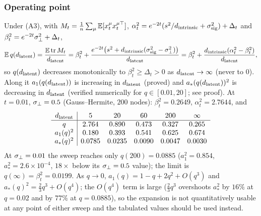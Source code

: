 \subsubsection{Operating point}

\begin{lemma}\label{lem:q-p1}
Under (A3), with $M_t=\tfrac1{n}\sum_\mu\mathbb{E}[x_t^\mu x_t^{\mu\top}]$, $\alpha_t^2=e^{-2t}(s^2/d_{\mathrm{intrinsic}}+\sigma_{\mathrm{sig}}^2)+\Delta_t$ and $\beta_t^2=e^{-2t}\sigma_{\perp}^2+\Delta_t$,
\begin{equation}\label{eq:q-p1}
\mathbb{E}\,q(d_{\mathrm{latent}})=\frac{\mathbb{E}\operatorname{tr}M_t}{d_{\mathrm{latent}}}=\beta_t^2+\frac{e^{-2t}\big(s^2+d_{\mathrm{intrinsic}}(\sigma_{\mathrm{sig}}^2-\sigma_{\perp}^2)\big)}{d_{\mathrm{latent}}}=\beta_t^2+\frac{d_{\mathrm{intrinsic}}(\alpha_t^2-\beta_t^2)}{d_{\mathrm{latent}}},
\end{equation}
so $q(d_{\mathrm{latent}})$ decreases monotonically to $\beta_t^2\ge\Delta_t>0$ as $d_{\mathrm{latent}}\to\infty$ (never to $0$). Along it $a_1(q(d_{\mathrm{latent}}))$ is increasing in $d_{\mathrm{latent}}$ (proved) and $a_*(q(d_{\mathrm{latent}}))^2$ is decreasing in $d_{\mathrm{latent}}$ (verified numerically for $q\in[0.01,20]$; see proof). At $t=0.01$, $\sigma_{\perp}=0.5$ (Gauss--Hermite, $200$ nodes): $\beta_t^2=0.2649$, $\alpha_t^2=2.7644$, and
\[
\begin{array}{c|ccccc}
d_{\mathrm{latent}}&5&20&60&200&\infty\\\hline
q&2.764&0.890&0.473&0.327&0.265\\
a_1(q)^2&0.180&0.393&0.541&0.625&0.674\\
a_*(q)^2&0.0785&0.0235&0.0090&0.0047&0.0030
\end{array}
\]
At $\sigma_{\perp}=0.01$ the sweep reaches only $q(200)=0.0885$ ($a_1^2=0.854$, $a_*^2=2.6\times10^{-4}$, $18\times$ below its $\sigma_{\perp}=0.5$ value); the limit is $q(\infty)=\beta_t^2=0.0199$. As $q\to0$, $a_1(q)=1-q+2q^2+O(q^3)$ and $a_*(q)^2=\tfrac23q^3+O(q^4)$; the $O(q^4)$ term is large ($\tfrac23q^3$ overshoots $a_*^2$ by $16\%$ at $q=0.02$ and by $77\%$ at $q=0.0885$), so the expansion is not quantitatively usable at any point of either sweep and the tabulated values should be used instead.
\end{lemma}
